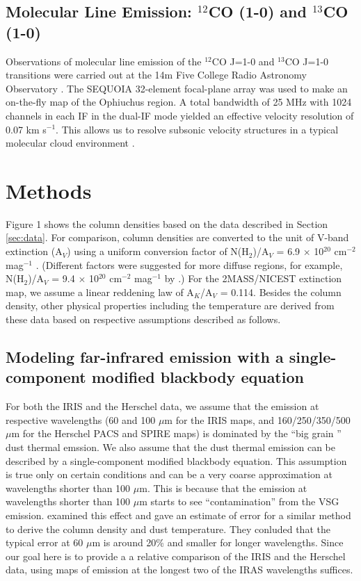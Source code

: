 \documentclass[11pt,a4paper]{emulateapj}
\begin{document}
\subsection{Molecular Line Emission: $^{12}$CO (1-0) and $^{13}$CO (1-0)}
Observations of molecular line emission of the $^{12}$CO J=1-0 and $^{13}$CO J=1-0 transitions were carried out at the 14m Five College Radio Astronomy Observatory \citep[FCRAO;]{Ridge_2006}. The SEQUOIA 32-element focal-plane array was used to make an on-the-fly map of the Ophiuchus region. A total bandwidth of 25 MHz with 1024 channels in each IF in the dual-IF mode yielded an effective velocity resolution of 0.07 km s$^{-1}$. This allows us to resolve subsonic velocity structures in a typical molecular cloud environment \citep[with a temperature of 15 K and an average molecular weight of 2.33 m$_H$;]{Carey_1998,Pillai_2006}.

\section{Methods}
\label{sec:methods}
Figure 1 shows the column densities based on the data described in Section \ref{sec:data}. For comparison, column densities are converted to the unit of V-band extinction (A$_V$) using a uniform conversion factor of N(H$_2$)/A$_V$ = 6.9 $\times$ 10$^{20}$ cm$^{-2}$ mag$^{-1}$ \citep{Draine_2003,Evans_2009}. (Different factors were suggested for more diffuse regions, for example, N(H$_2$)/A$_V$ = 9.4 $\times$ 10$^{20}$ cm$^{-2}$ mag$^{-1}$ by \citet{Bohlin_1978}.) For the 2MASS/NICEST extinction map, we assume a linear reddening law of A$_K$/A$_V$ = 0.114. Besides the column density, other physical properties including the temperature are derived from these data based on respective assumptions described as follows.

\subsection{Modeling far-infrared emission with a single-component modified blackbody equation}
For both the IRIS and the Herschel data, we assume that the emission at respective wavelengths (60 and 100 $\mu$m for the IRIS maps, and 160/250/350/500 $\mu$m for the Herschel PACS and SPIRE maps) is dominated by the ``big grain \citep[BG;]{Stepnik_2003}'' dust thermal emssion. We also assume that the dust thermal emission can be described by a single-component modified blackbody equation. This assumption is true only on certain conditions and can be a very coarse approximation at wavelengths shorter than 100 $\mu$m. This is because that the emission at wavelengths shorter than 100 $\mu$m starts to see ``contamination'' from the VSG emission. \citet{Schnee_2007} examined this effect and gave an estimate of error for a similar method to derive the column density and dust temperature. They conluded that the typical error at 60 $\mu$m is around 20\% and smaller for longer wavelengths. Since our goal here is to provide a a relative comparison of the IRIS and the Herschel data, using maps of emission at the longest two of the IRAS wavelengths suffices.
\end{document}
